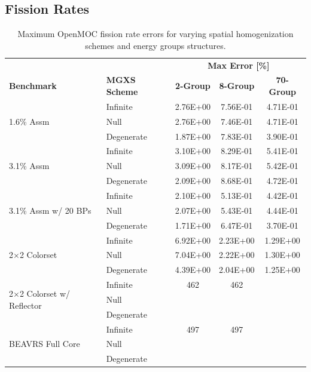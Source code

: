 \subsection{Fission Rates}
\label{subsec:chap8-fiss-rates}

\begin{table}[h!]
  \centering
  \caption[Maximum OpenMOC fission rate errors]{Maximum OpenMOC fission rate errors for varying spatial homogenization schemes and energy groups structures.}
  \small
  \label{table:chap8-openmoc-max-fiss-rates}
  \vspace{6pt}
  \begin{tabular}{l l c c c}
  \toprule
  \rowcolor{lightgray}
  & & \multicolumn{3}{c}{\cellcolor{lightgray} \textbf{Max Error [\%]}} \\
  \multirow{-2}{*}{\cellcolor{lightgray} \bf Benchmark} &
  \multirow{-2}{*}{\cellcolor{lightgray} \bf \ac{MGXS} Scheme} &
  {\cellcolor{lightgray} \bf 2-Group} &
  {\cellcolor{lightgray} \bf 8-Group} &
  {\cellcolor{lightgray} \bf 70-Group} \\
  \midrule
\multirow{3}{*}{\parbox{2.5cm}{1.6\% Assm}} & Infinite & 2.76E+00 & 7.56E-01 & 4.71E-01 \\
& Null & 2.76E+00 & 7.46E-01 & 4.71E-01 \\
& Degenerate & 1.87E+00 & 7.83E-01 & 3.90E-01 \\
  \midrule
\multirow{3}{*}{\parbox{2.5cm}{3.1\% Assm}} & Infinite & 3.10E+00 & 8.29E-01 & 5.41E-01 \\
& Null & 3.09E+00 & 8.17E-01 & 5.42E-01 \\
& Degenerate & 2.09E+00 & 8.68E-01 & 4.72E-01 \\
  \midrule
\multirow{3}{*}{\parbox{2.5cm}{3.1\% Assm w/ 20 BPs}} & Infinite & 2.10E+00 & 5.13E-01 & 4.42E-01 \\
& Null & 2.07E+00 & 5.43E-01 & 4.44E-01 \\
& Degenerate & 1.71E+00 & 6.47E-01 & 3.70E-01 \\
  \midrule
  \multirow{3}{*}{\parbox{2.5cm}{2$\times$2 Colorset}} & Infinite & 6.92E+00 & 2.23E+00 & 1.29E+00 \\
& Null & 7.04E+00 & 2.22E+00 & 1.30E+00 \\
& Degenerate & 4.39E+00 & 2.04E+00 & 1.25E+00 \\
  \midrule
  \multirow{3}{*}{\parbox{2.3cm}{2$\times$2 Colorset w/ Reflector}} & Infinite & 462 & 462 & \\
  & Null & & & \\
  & Degenerate & & & \\
  \midrule
  \multirow{3}{*}{\parbox{2cm}{\ac{BEAVRS} Full Core}} & Infinite & 497 & 497 & \\
  & Null & & & \\
  & Degenerate & & & \\
  \bottomrule
\end{tabular}
\end{table}

